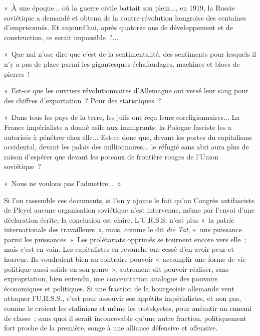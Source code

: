 \documentclass[french,twoside]{book} %
\begin{document}
« À une époque... où la guerre civile battait son plein..., en 1919, la Russie soviétique a demandé et obtenu de la contre-révolution hongroise des centai­nes d'emprisonnés. Et aujourd'hui, après quatorze ans de développement et de construction, ce serait impossible ?...\par
« Que nul n'ose dire que c'est de la sentimentalité, des sentiments pour lesquels il n'y a pas de place parmi les gigantesques échafaudages, machines et blocs de pierres !\par
\par
« Est-ce que les ouvriers révolutionnaires d'Allemagne ont versé leur sang pour des chiffres d'exportation ? Pour des statistiques ?\par
« Dans tous les pays de la terre, les juifs ont reçu leurs coreligionnaires... La France impérialiste a donné asile aux immigrants, la Pologne fasciste les a autorisés à pénétrer chez elle... Est-ce donc que, devant les portes du capitalis­me occidental, devant les palais des millionnaires... le réfugié sans abri aura plus de raison d'espérer que devant les poteaux de frontière rouges de l'Union soviétique ?\par
« Nous ne voulons pas l'admettre... »\par
Si l'on rassemble ces documents, si l'on y ajoute le fait qu'au Congrès antifasciste de Pleyel aucune organisation soviétique n'est intervenue, même par l'envoi d'une déclaration écrite, la conclusion est claire. L'U.R.S.S. n'est plus « la patrie internationale des travailleurs », mais, comme le dit {\itshape die Tat}, « une puissance parmi les puissances ». Les prolétariats opprimés se tournent encore vers elle ; mais c'est en vain. Les capitalistes en revanche ont cessé d'en avoir peur et horreur. Ils voudraient bien au contraire pouvoir « accomplir une forme de vie politique aussi solide en son genre », autrement dit pouvoir réaliser, sans expropriation, bien entendu, une concentration analogue des pouvoirs économiques et politiques. Si une fraction de la bourgeoisie alleman­de veut attaquer l'U.R.S.S., c'est pour assouvir ses appétits impérialistes, et non pas, comme le croient les staliniens et même les trotskystes, pour anéantir un ennemi de classe ; sans quoi il serait inconcevable qu'une autre fraction, politiquement fort proche de la première, songe à une alliance défensive et offensive.\par
\end{document}
